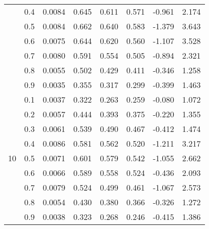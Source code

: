 \documentclass[11pt,a4paper]{report}
\begin{document}
\begin{longtable}{ | c | c || c | c | c | c | c | c | }
 & 0.4 & 0.0084 & 0.645 & 0.611 & 0.571 & -0.961 & 2.174 \\
 & 0.5 & 0.0084 & 0.662 & 0.640 & 0.583 & -1.379 & 3.643 \\
 & 0.6 & 0.0075 & 0.644 & 0.620 & 0.560 & -1.107 & 3.528 \\
 & 0.7 & 0.0080 & 0.591 & 0.554 & 0.505 & -0.894 & 2.321 \\
 & 0.8 & 0.0055 & 0.502 & 0.429 & 0.411 & -0.346 & 1.258 \\
 & 0.9 & 0.0035 & 0.355 & 0.317 & 0.299 & -0.399 & 1.463 \\
 \hline
\multirow{9}{*}{10} & 0.1 & 0.0037 & 0.322 & 0.263 & 0.259 & -0.080 & 1.072 \\
 & 0.2 & 0.0057 & 0.444 & 0.393 & 0.375 & -0.220 & 1.355 \\
 & 0.3 & 0.0061 & 0.539 & 0.490 & 0.467 & -0.412 & 1.474 \\
 & 0.4 & 0.0086 & 0.581 & 0.562 & 0.520 & -1.211 & 3.217 \\
 & 0.5 & 0.0071 & 0.601 & 0.579 & 0.542 & -1.055 & 2.662 \\
 & 0.6 & 0.0066 & 0.589 & 0.558 & 0.524 & -0.436 & 2.093 \\
 & 0.7 & 0.0079 & 0.524 & 0.499 & 0.461 & -1.067 & 2.573 \\
 & 0.8 & 0.0054 & 0.430 & 0.380 & 0.366 & -0.326 & 1.272 \\
 & 0.9 & 0.0038 & 0.323 & 0.268 & 0.246 & -0.415 & 1.386 \\
 \hline
\hline
\end{longtable}
\end{document}
